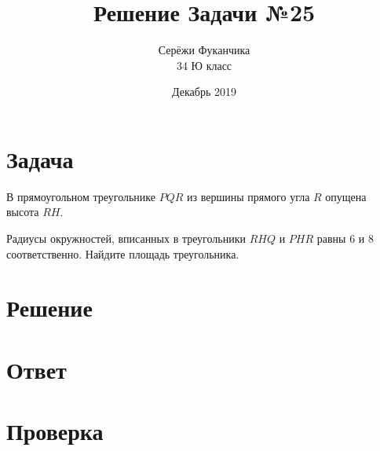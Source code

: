 \documentclass{article}
\title{Решение Задачи №25}
\author{Серёжи Фуканчика\\34 Ю класс}
\date{Декабрь 2019}
\begin{document}
\maketitle

\section{Задача}
В прямоугольном треугольнике $PQR$ из вершины прямого угла $R$ опущена высота $RH$.

Радиусы окружностей, вписанных в треугольники $RHQ$ и $PHR$ равны $6$ и $8$ соответственно. Найдите площадь треугольника.

\section{Решение}

\section{Ответ}

\section{Проверка}
\end{document}
